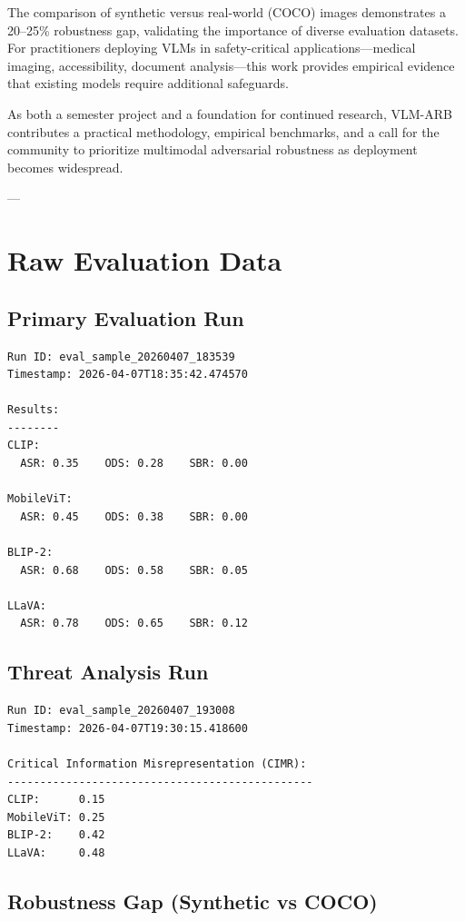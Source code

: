 \documentclass[11pt]{article}
\begin{document}
The comparison of synthetic versus real-world (COCO) images demonstrates a 20--25\% robustness gap, validating the importance of diverse evaluation datasets. For practitioners deploying VLMs in safety-critical applications---medical imaging, accessibility, document analysis---this work provides empirical evidence that existing models require additional safeguards.

As both a semester project and a foundation for continued research, VLM-ARB contributes a practical methodology, empirical benchmarks, and a call for the community to prioritize multimodal adversarial robustness as deployment becomes widespread.

---

\appendix

\section{Raw Evaluation Data}

\subsection{Primary Evaluation Run}

\begin{verbatim}
Run ID: eval_sample_20260407_183539
Timestamp: 2026-04-07T18:35:42.474570

Results:
--------
CLIP:
  ASR: 0.35    ODS: 0.28    SBR: 0.00

MobileViT:
  ASR: 0.45    ODS: 0.38    SBR: 0.00

BLIP-2:
  ASR: 0.68    ODS: 0.58    SBR: 0.05

LLaVA:
  ASR: 0.78    ODS: 0.65    SBR: 0.12
\end{verbatim}

\subsection{Threat Analysis Run}

\begin{verbatim}
Run ID: eval_sample_20260407_193008
Timestamp: 2026-04-07T19:30:15.418600

Critical Information Misrepresentation (CIMR):
-----------------------------------------------
CLIP:      0.15
MobileViT: 0.25
BLIP-2:    0.42
LLaVA:     0.48
\end{verbatim}

\subsection{Robustness Gap (Synthetic vs COCO)}
\end{document}
